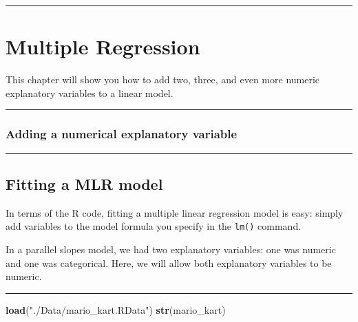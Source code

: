 \documentclass[
]{book}
\newenvironment{Shaded}{\begin{snugshade}}{\end{snugshade}}
\newcommand{\KeywordTok}[1]{\textcolor[rgb]{0.13,0.29,0.53}{\textbf{#1}}}
\newcommand{\NormalTok}[1]{#1}
\newcommand{\StringTok}[1]{\textcolor[rgb]{0.31,0.60,0.02}{#1}}
\begin{document}
\begin{center}\rule{0.5\linewidth}{0.5pt}\end{center}

\hypertarget{multiple-regression}{%
\chapter{Multiple Regression}\label{multiple-regression}}

This chapter will show you how to add two, three, and even more numeric explanatory variables to a linear model.

\begin{center}\rule{0.5\linewidth}{0.5pt}\end{center}

\hypertarget{adding-a-numerical-explanatory-variable}{%
\subsection*{Adding a numerical explanatory variable}\label{adding-a-numerical-explanatory-variable}}

\begin{center}\rule{0.5\linewidth}{0.5pt}\end{center}

\hypertarget{fitting-a-mlr-model}{%
\section{Fitting a MLR model}\label{fitting-a-mlr-model}}

In terms of the R code, fitting a multiple linear regression model is easy: simply add variables to the model formula you specify in the \texttt{lm()} command.

In a parallel slopes model, we had two explanatory variables: one was numeric and one was categorical. Here, we will allow both explanatory variables to be numeric.

\begin{center}\rule{0.5\linewidth}{0.5pt}\end{center}

\begin{Shaded}
\begin{Highlighting}[]
\KeywordTok{load}\NormalTok{(}\StringTok{"./Data/mario_kart.RData"}\NormalTok{)}
\KeywordTok{str}\NormalTok{(mario_kart)}
\end{Highlighting}
\end{Shaded}
\end{document}
